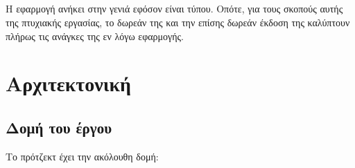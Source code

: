 \subsection*{}
\pSpace Η εφαρμογή ανήκει στην γενιά  εφόσον είναι  τύπου. Οπότε, για τους σκοπούς αυτής της πτυχιακής εργασίας, το δωρεάν  της  και την επίσης δωρεάν έκδοση της  καλύπτουν πλήρως τις ανάγκες της εν λόγω εφαρμογής.
\pagebreak

\section{Αρχιτεκτονική}

\subsection*{Δομή του έργου}
\pSpace Το πρότζεκτ έχει την ακόλουθη δομή:\\

